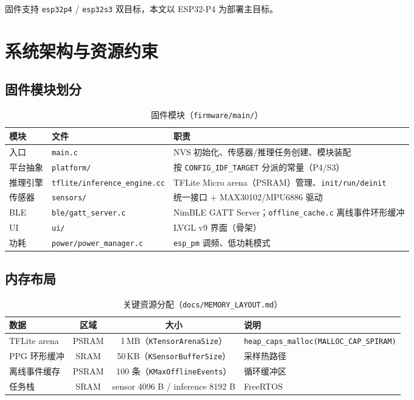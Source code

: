 \documentclass[11pt,a4paper]{ctexart}
\newcommand{\feat}[1]{\texttt{#1}}
\begin{document}
固件支持 \feat{esp32p4} / \feat{esp32s3} 双目标，本文以 ESP32-P4 为部署主目标。

\section{系统架构与资源约束}
\label{sec:system}

\subsection{固件模块划分}
\label{sec:firmware-layout}

\begin{table}[htbp]
\centering
\caption{固件模块（\feat{firmware/main/}）}
\label{tab:firmware}
\begin{tabular}{llp{9.2cm}}
\toprule
模块 & 文件 & 职责 \\
\midrule
入口 & \feat{main.c} & NVS 初始化、传感器/推理任务创建、模块装配 \\
平台抽象 & \feat{platform/} & 按 \feat{CONFIG\_IDF\_TARGET} 分派的常量（P4/S3） \\
推理引擎 & \feat{tflite/inference\_engine.cc} & TFLite Micro arena（PSRAM）管理、\feat{init/run/deinit} \\
传感器 & \feat{sensors/} & 统一接口 + MAX30102/MPU6886 驱动 \\
BLE & \feat{ble/gatt\_server.c} & NimBLE GATT Server；\feat{offline\_cache.c} 离线事件环形缓冲 \\
UI & \feat{ui/} & LVGL v9 界面（骨架） \\
功耗 & \feat{power/power\_manager.c} & \feat{esp\_pm} 调频、低功耗模式 \\
\bottomrule
\end{tabular}
\end{table}

\subsection{内存布局}
\label{sec:memory}

\begin{table}[htbp]
\centering
\caption{关键资源分配（\feat{docs/MEMORY\_LAYOUT.md}）}
\label{tab:memory}
\begin{tabular}{lccp{6.6cm}}
\toprule
数据 & 区域 & 大小 & 说明 \\
\midrule
TFLite arena & PSRAM & 1\,MB（\feat{KTensorArenaSize}） & \feat{heap\_caps\_malloc(MALLOC\_CAP\_SPIRAM)} \\
PPG 环形缓冲 & SRAM & 50\,KB（\feat{KSensorBufferSize}） & 采样热路径 \\
离线事件缓存 & PSRAM & 100 条（\feat{KMaxOfflineEvents}） & 循环缓冲区 \\
任务栈 & SRAM & sensor 4096 B / inference 8192 B & FreeRTOS \\
\bottomrule
\end{tabular}
\end{table}
\end{document}
